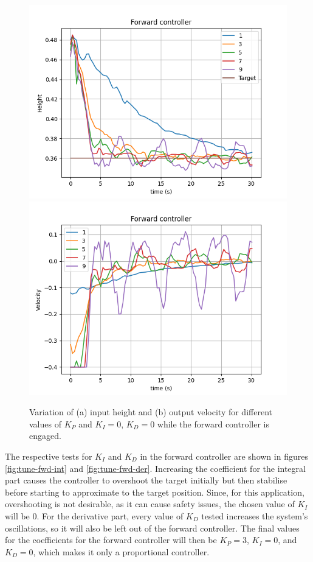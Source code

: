 \begin{figure}
  \centering
  \includegraphics[width=.45\linewidth]{img/pid/fwd/aaa_fwd_pos_prop_i0_d0.png}
  \includegraphics[width=.45\linewidth]{img/pid/fwd/aaa_fwd_vel_prop_i0_d0.png}
  \caption{Variation of (a) input height and (b) output velocity for different values of $K_{P}$ and $K_I=0$, $K_D=0$ while the forward controller is engaged.}\label{fig:tune-fwd-prop}
\end{figure}


The respective tests for $K_I$ and $K_D$ in the forward controller are shown in figures \ref{fig:tune-fwd-int} and \ref{fig:tune-fwd-der}.
Increasing the coefficient for the integral part causes the controller to overshoot the target initially but then stabilise before starting to approximate to the target position.
Since, for this application, overshooting is not desirable, as it can cause safety issues, the chosen value of $K_I$ will be 0.
For the derivative part, every value of $K_D$ tested increases the system's oscillations, so it will also be left out of the forward controller.
The final values for the coefficients for the forward controller will then be $K_P=3$, $K_I=0$, and $K_D=0$, which makes it only a proportional controller.


